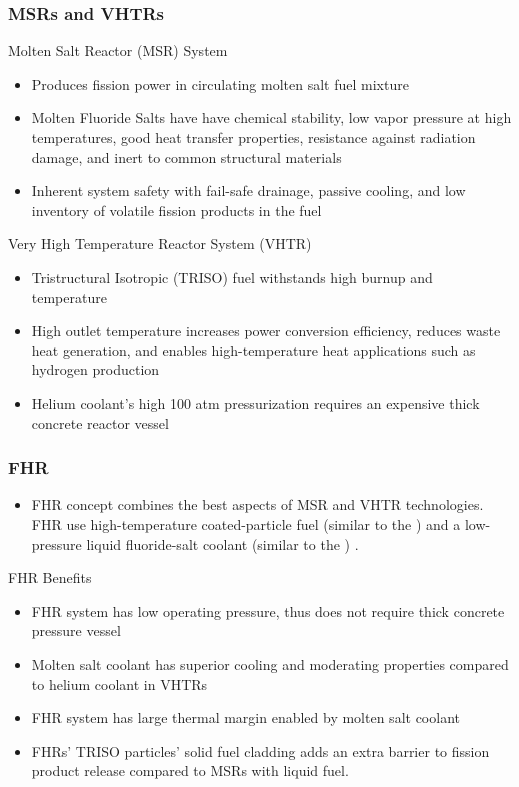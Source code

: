 \begin{frame}
  \frametitle{MSRs and VHTRs}
  \begin{block}{Molten Salt Reactor (MSR) System}
    \begin{itemize}
      \item Produces fission power in circulating molten salt fuel mixture
      \item Molten Fluoride Salts have have chemical stability, low vapor pressure 
      at high temperatures, good heat transfer properties, resistance against 
      radiation damage, and inert to common structural materials
      \item Inherent system safety with fail-safe drainage, passive cooling, and 
      low inventory of volatile fission products in the fuel
    \end{itemize}
  \end{block}
  \vspace{-0.25cm}
  \begin{block}{Very High Temperature Reactor System (VHTR)}
    \begin{itemize}
      \item Tristructural Isotropic (TRISO) fuel withstands high burnup and 
      temperature
      \item High outlet temperature increases power conversion efficiency, reduces 
      waste heat generation, and enables high-temperature heat applications 
      such as hydrogen production
      \item Helium coolant's high 100 atm pressurization requires an expensive thick
      concrete reactor vessel
    \end{itemize}
  \end{block}
\end{frame}
\begin{frame}
  \frametitle{FHR}
  \begin{itemize}
    \item \acrlong{FHR} concept combines the best aspects of \acrlong{MSR} and \acrlong{VHTR} technologies. 
      \acrshort{FHR} use high-temperature coated-particle fuel (similar to the ) 
      and a low-pressure liquid fluoride-salt coolant (similar to the )
      \cite{forsberg_fluoride-salt-cooled_2012,facilitators_fluoride-salt-cooled_2013}.
  \end{itemize}
  \begin{block}{\acrfull{FHR} Benefits}
    \begin{itemize}
      \item FHR system has low operating pressure, thus does not require thick 
      concrete pressure vessel 
      \item Molten salt coolant has superior cooling and moderating properties 
      compared to helium coolant in VHTRs
      \item FHR system has large thermal margin enabled by molten salt coolant
      \item FHRs' TRISO particles' solid fuel cladding adds an extra barrier to 
      fission product release compared to MSRs with liquid fuel.
    \end{itemize}
  \end{block}
\end{frame}
